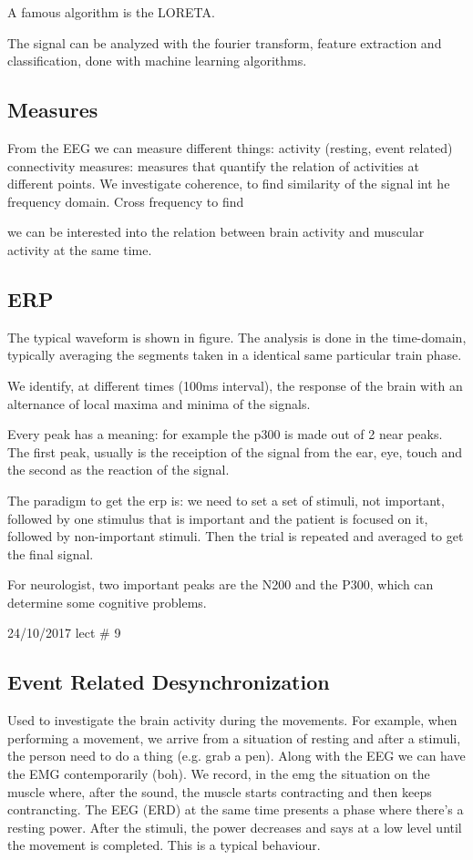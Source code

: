  A famous algorithm is the LORETA.

 The signal can be analyzed with the fourier transform, feature extraction and classification, done with machine learning algorithms.

\subsection{Measures}
From the EEG we can measure different things:
activity (resting, event related)
connectivity measures: measures that quantify the relation of activities at different points. We investigate coherence, to find similarity of the signal int he frequency domain. Cross frequency to find

we can be interested into the relation between brain activity and muscular activity at the same time.

\subsection{ERP}
The typical waveform is shown in figure. The analysis is done in the time-domain, typically averaging the segments taken in a identical same particular train phase.

We identify, at different times (100ms interval), the response of the brain with an alternance of local maxima and minima of the signals.

Every peak has a meaning: for example the p300 is made out of 2 near peaks.
The first peak, usually is the receiption of the signal from the ear, eye, touch and the second as the reaction of the signal.

The paradigm to get the erp is:
we need to set a set of stimuli, not important, followed by one stimulus that is important and the patient is focused on it, followed by non-important stimuli. Then the trial is repeated and averaged to get the final signal.

For neurologist, two important peaks are the N200 and the P300, which can determine some cognitive problems.

24/10/2017 lect \# 9

\subsection{Event Related Desynchronization}
Used to investigate the brain activity during the movements. For example, when performing a movement, we arrive from a situation of resting and after a stimuli, the person need to do a thing (e.g. grab a pen). Along with the EEG we can have the EMG contemporarily (boh). We record, in the emg the situation on the muscle where, after the sound, the muscle starts contracting and then keeps contrancting. The EEG (ERD) at the same time presents a phase where there's a resting power. After the stimuli, the power decreases and says at a low level until the movement is completed. This is a typical behaviour.

